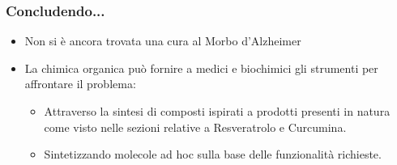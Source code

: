 \documentclass[9pt]{beamer}
\begin{document}
\begin{frame}
	\frametitle{Concludendo...}
	\begin{itemize}
		\item Non si è ancora trovata una cura al Morbo d'Alzheimer
		\item La chimica organica può fornire a medici e biochimici gli strumenti per affrontare il problema: \begin{itemize}
			      \item Attraverso la sintesi di composti ispirati a prodotti 	presenti in natura come visto nelle sezioni relative a Resveratrolo e Curcumina.
			      \item Sintetizzando molecole ad hoc sulla base delle funzionalità richieste.
		      \end{itemize}
	\end{itemize}
\end{frame}


\begin{frame}
\end{frame}
\end{document}
